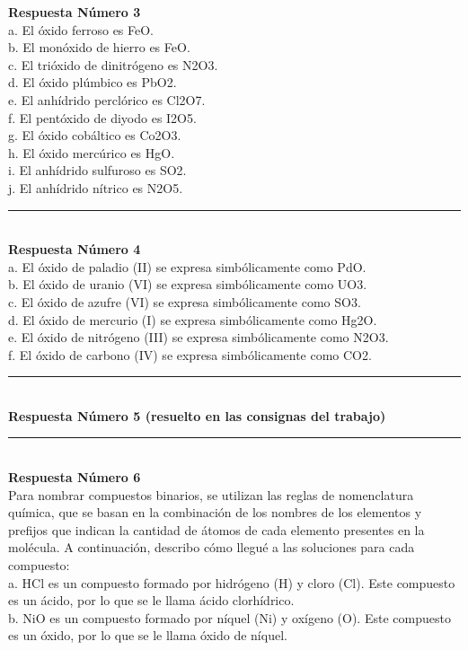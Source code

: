 \documentclass{article}
\begin{document}
\textbf{Respuesta Número 3} \\
a. El óxido ferroso es FeO.\\
b. El monóxido de hierro es FeO.\\
c. El trióxido de dinitrógeno es N2O3.\\
d. El óxido plúmbico es PbO2.\\
e. El anhídrido perclórico es Cl2O7.\\
f. El pentóxido de diyodo es I2O5.\\
g. El óxido cobáltico es Co2O3.\\
h. El óxido mercúrico es HgO.\\
i. El anhídrido sulfuroso es SO2.\\
j. El anhídrido nítrico es N2O5.\\
\noindent\rule{\textwidth}{1pt} \\
\textbf{Respuesta Número 4} \\
a. El óxido de paladio (II) se expresa simbólicamente como PdO.\\
b. El óxido de uranio (VI) se expresa simbólicamente como UO3.\\
c. El óxido de azufre (VI) se expresa simbólicamente como SO3.\\
d. El óxido de mercurio (I) se expresa simbólicamente como Hg2O.\\
e. El óxido de nitrógeno (III) se expresa simbólicamente como N2O3.\\
f. El óxido de carbono (IV) se expresa simbólicamente como CO2.\\
\noindent\rule{\textwidth}{1pt} \\
\textbf{Respuesta Número 5 (resuelto en las consignas del trabajo)} \\
\noindent\rule{\textwidth}{1pt} \\
\textbf{Respuesta Número 6} \\
Para nombrar compuestos binarios, se utilizan las reglas de nomenclatura química, que se basan en la combinación de los nombres de los elementos y prefijos que indican la cantidad de átomos de cada elemento presentes en la molécula. A continuación, describo cómo llegué a las soluciones para cada compuesto:\\
a. HCl es un compuesto formado por hidrógeno (H) y cloro (Cl). Este compuesto es un ácido, por lo que se le llama ácido clorhídrico.\\
b. NiO es un compuesto formado por níquel (Ni) y oxígeno (O). Este compuesto es un óxido, por lo que se le llama óxido de níquel.\\
\end{document}
